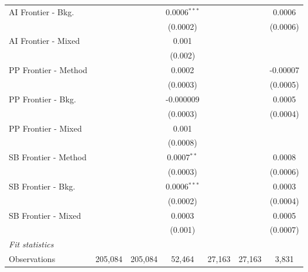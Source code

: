 \begin{tabular}{lcccccc}
   AI Frontier - Bkg.   &               &               & 0.0006$^{***}$ &          &               & 0.0006\\   
                        &               &               & (0.0002)       &          &               & (0.0006)\\   
   AI Frontier - Mixed  &               &               & 0.001          &          &               &   \\   
                        &               &               & (0.002)        &          &               &   \\   
   PP Frontier - Method &               &               & 0.0002         &          &               & -0.00007\\   
                        &               &               & (0.0003)       &          &               & (0.0005)\\   
   PP Frontier - Bkg.   &               &               & -0.000009      &          &               & 0.0005\\   
                        &               &               & (0.0003)       &          &               & (0.0004)\\   
   PP Frontier - Mixed  &               &               & 0.001          &          &               &   \\   
                        &               &               & (0.0008)       &          &               &   \\   
   SB Frontier - Method &               &               & 0.0007$^{**}$  &          &               & 0.0008\\   
                        &               &               & (0.0003)       &          &               & (0.0006)\\   
   SB Frontier - Bkg.   &               &               & 0.0006$^{***}$ &          &               & 0.0003\\   
                        &               &               & (0.0002)       &          &               & (0.0004)\\   
   SB Frontier - Mixed  &               &               & 0.0003         &          &               & 0.0005\\   
                        &               &               & (0.001)        &          &               & (0.0007)\\   
   \midrule
   \emph{Fit statistics}\\
   Observations         & 205,084       & 205,084       & 52,464         & 27,163   & 27,163        & 3,831\\  

\end{tabular}
